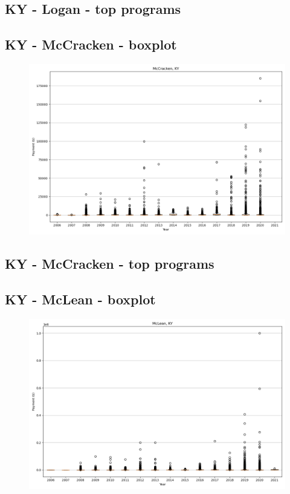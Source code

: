 \subsection*{KY - Logan - top programs}

\newpage
\subsection*{KY - McCracken - boxplot}
\begin{figure}[h]
\centering
\includegraphics[width=7in]{../output/boxplots/counties/McCracken-KY_boxplot.png}
\end{figure}


\subsection*{KY - McCracken - top programs}

\newpage
\subsection*{KY - McLean - boxplot}
\begin{figure}[h]
\centering
\includegraphics[width=7in]{../output/boxplots/counties/McLean-KY_boxplot.png}
\end{figure}


